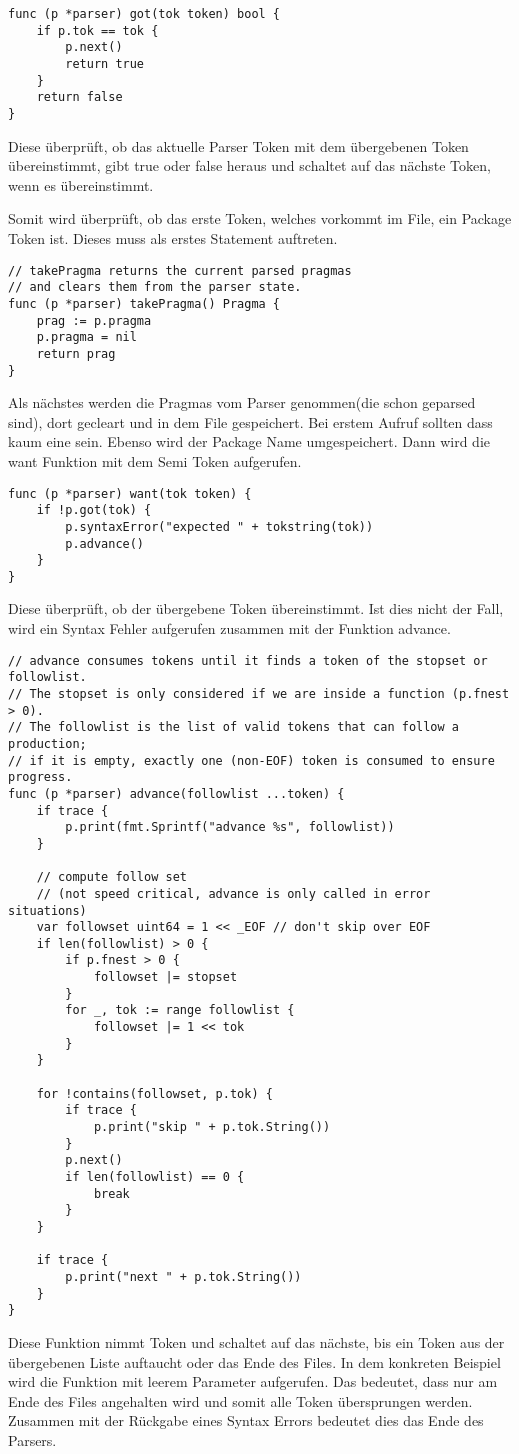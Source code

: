 \begin{lstlisting}
func (p *parser) got(tok token) bool {
	if p.tok == tok {
		p.next()
		return true
	}
	return false
}
\end{lstlisting}
Diese überprüft, ob das aktuelle Parser Token mit dem übergebenen Token übereinstimmt, gibt true oder false heraus und schaltet auf das nächste Token, wenn es übereinstimmt.

Somit wird überprüft, ob das erste Token, welches vorkommt im File, ein Package Token ist. Dieses muss als erstes Statement auftreten.

\begin{lstlisting}
// takePragma returns the current parsed pragmas
// and clears them from the parser state.
func (p *parser) takePragma() Pragma {
	prag := p.pragma
	p.pragma = nil
	return prag
}
\end{lstlisting}
Als nächstes werden die Pragmas vom Parser genommen(die schon geparsed sind), dort gecleart und in dem File gespeichert. Bei erstem Aufruf sollten dass kaum eine sein. Ebenso wird der Package Name umgespeichert. Dann wird die want Funktion mit dem Semi Token aufgerufen.

\begin{lstlisting}
func (p *parser) want(tok token) {
	if !p.got(tok) {
		p.syntaxError("expected " + tokstring(tok))
		p.advance()
	}
}
\end{lstlisting}
Diese überprüft, ob der übergebene Token übereinstimmt. Ist dies nicht der Fall, wird ein Syntax Fehler aufgerufen zusammen mit der Funktion advance. 

\begin{lstlisting}
// advance consumes tokens until it finds a token of the stopset or followlist.
// The stopset is only considered if we are inside a function (p.fnest > 0).
// The followlist is the list of valid tokens that can follow a production;
// if it is empty, exactly one (non-EOF) token is consumed to ensure progress.
func (p *parser) advance(followlist ...token) {
	if trace {
		p.print(fmt.Sprintf("advance %s", followlist))
	}

	// compute follow set
	// (not speed critical, advance is only called in error situations)
	var followset uint64 = 1 << _EOF // don't skip over EOF
	if len(followlist) > 0 {
		if p.fnest > 0 {
			followset |= stopset
		}
		for _, tok := range followlist {
			followset |= 1 << tok
		}
	}

	for !contains(followset, p.tok) {
		if trace {
			p.print("skip " + p.tok.String())
		}
		p.next()
		if len(followlist) == 0 {
			break
		}
	}

	if trace {
		p.print("next " + p.tok.String())
	}
}
\end{lstlisting}
Diese Funktion nimmt Token und schaltet auf das nächste, bis ein Token aus der übergebenen Liste auftaucht oder das Ende des Files. In dem konkreten Beispiel wird die Funktion mit leerem Parameter aufgerufen. Das bedeutet, dass nur am Ende des Files angehalten wird und somit alle Token übersprungen werden. Zusammen mit der Rückgabe eines Syntax Errors bedeutet dies das Ende des Parsers.

